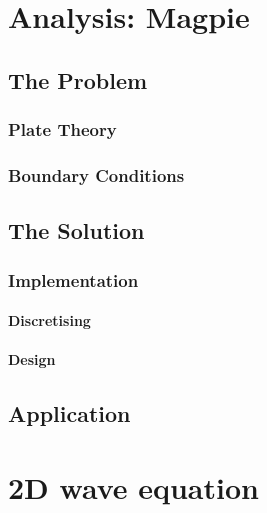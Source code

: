 %
%
%

\chapter{Analysis: Magpie}\label{analysis-magpie}

\section{The Problem}\label{the-problem-2}

\subsection{Plate Theory}\label{plate-theory}

\subsection{Boundary Conditions}\label{boundary-conditions}

\section{The Solution}\label{the-solution-1}

\subsection{Implementation}\label{implementation}

\subsubsection{Discretising}\label{discretising}
\subsubsection{Design}\label{design}

\section{Application}\label{application-1}

\chapter{2D wave equation}
\label{chapter3}
